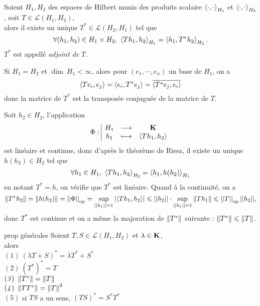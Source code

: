\documentclass[a4paper,11pt, twoside]{article}
\begin{document}
\newpage



\begin{corollaire}
  Soient $H_1,H_2$ des espaces de Hilbert munis des produits scalaire $\left\langle \cdot,\cdot \right\rangle_{H_1}$ et $\left\langle \cdot,\cdot \right\rangle_{H_2}$, soit $T\in\mathcal L(H_1,H_2)$,\\

  alors il existe un unique $T^*\in \mathcal L(H_2,H_1)$ tel que 
  $$\forall (h_1,h_2)\in H_1\times H_2,\ \left\langle Th_1,h_2 \right\rangle_{H_1}=\left\langle h_1,T^*h_2 \right\rangle_{H_2}.$$
  $T^*$ est appellé \emph{adjoint de }$T$.
\end{corollaire}


\begin{RQ}
  Si $H_1=H_2$ et $\dim\ H_1<\infty$, alors pour $(e_1,\cdots,e_n)$ un base de $H_1$, on a 
  $$\left\langle Te_i,e_j \right\rangle=\left\langle e_i,T^*e_j \right\rangle=\overline{\left\langle T^*e_j,e_i \right\rangle}$$
  donc la matrice de $T^*$ est la transposée conjuguée de la matrice de $T$. 
\end{RQ}


\begin{Proof}
  Soit $h_2\in H_2$, l'application
  $$\Phi:\begin{array}{|ccc}
    H_1&\longrightarrow&\mathbf K\\
    h_1&\longmapsto&\left\langle Th_1,h_2 \right\rangle
  \end{array}$$
  est linéaire et continue, donc d'après le théorème de Riesz, il existe un unique $h(h_2)\in H_2$ tel que 
  $$\forall h_1\in H_1,\ \ps{Th_1,h_2}_{H_2}=\ps{h_1,h(h_2)}_{H_1}$$
  en notant $T^*=h$, on vérifie que $T^*$ est linéaire. Quand à la continuité, on a 
  $$\left\lVert T^*h_2\right\rVert=\left\lVert h(h_2)\right\rVert=\left|\left|\Phi\right|\right|_{\mathrm{op}}=\underset{||h_1||=1}{\mathrm{sup}}\left| \left\langle Th_1,h_2 \right\rangle\right|\leqslant ||h_2||\cdot\underset{||h_1||=1}{\mathrm{sup}}\left\lVert Th_1\right\rVert\leqslant \left|\left|T\right|\right|_{\mathrm{op}}||h_2||,$$
  donc $T^*$ est continue et on a même la majoration de $\left\lVert T^*\right\rVert$ suivante : $\left\lVert T^*\right\rVert\leqslant \left\lVert T\right\rVert$.
\end{Proof}


\begin{propC}{prop générales}
  Soient $T,S\in\mathcal L(H_1,H_2)$ et $\lambda\in\mathbf K$,\\
 
  alors\\
  $(\mathit 1)\ \left(\lambda T+ S\right)^*=\overline{\lambda}T^*+S^*$\\
  $(\mathit 2)\ \left(T^*\right)^*=T$\\
  $(\mathit 3)\ \norm{T^*}=\norm{T}$\\
  $(\mathit 4)\  \left\lVert TT^*\right\rVert=\left\lVert T\right\rVert^2$\\
  $(\mathit 5)$ si $TS$ a un sens, $\left(TS\right)^*=S^*T^*$
\end{propC}
\end{document}
